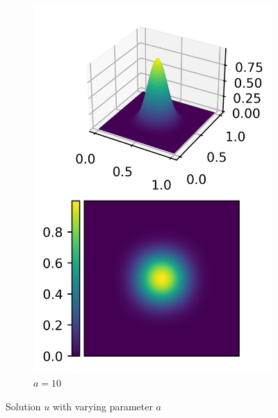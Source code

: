 \documentclass[11pt,a4paper]{article}
\begin{document}
\begin{figure}
\begin{subfigure}{.5\textwidth}
    \includegraphics[width=.6\linewidth]{contour_10}
    \caption{$a = 10$}
  \end{subfigure}
  \caption{Solution $u$ with varying parameter $a$}
  \label{fig:smooth_dirichlet_solution}
\end{figure}
\end{document}
